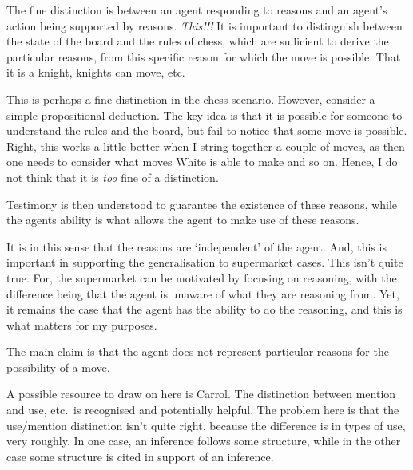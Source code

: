\documentclass[10pt]{article}
\begin{document}
\begin{note}
  The fine distinction is between an agent responding to reasons and an agent's action being supported by reasons.
  {
    \color{red} \emph{This!!!}
  }
  It is important to distinguish between the state of the board and the rules of chess, which are sufficient to derive the particular reasons, from this specific reason for which the move is possible.
  That it is a knight, knights can move, etc.

  This is perhaps a fine distinction in the chess scenario.
  However, consider a simple propositional deduction.
  The key idea is that it is possible for someone to understand the rules and the board, but fail to notice that some move is possible.
  Right, this works a little better when I string together a couple of moves, as then one needs to consider what moves White is able to make and so on.
  Hence, I do not think that it is \emph{too} fine of a distinction.

  Testimony is then understood to guarantee the existence of these reasons, while the agents ability is what allows the agent to make use of these reasons.

  It is in this sense that the reasons are `independent' of the agent.
  And, this is important in supporting the generalisation to supermarket cases.
  This isn't quite true.
  For, the supermarket can be motivated by focusing on reasoning, with the difference being that the agent is unaware of what they are reasoning from.
  Yet, it remains the case that the agent has the ability to do the reasoning, and this is what matters for my purposes.
\end{note}

\begin{note}
  The main claim is that the agent does not represent particular reasons for the possibility of a move.

  A possible resource to draw on here is Carrol.
  The distinction between mention and use, etc.\ is recognised and potentially helpful.
  The problem here is that the use/mention distinction isn't quite right, because the difference is in types of use, very roughly.
  In one case, an inference follows some structure, while in the other case some structure is cited in support of an inference.
\end{note}
\end{document}
